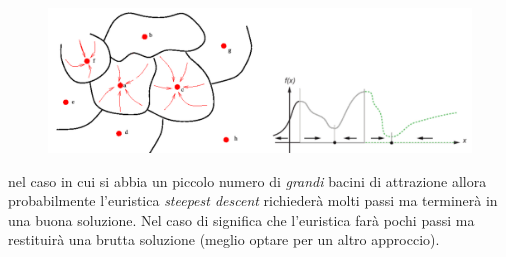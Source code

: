 \documentclass{article}
\begin{document}
\begin{figure}[h]
    \centering
    \includegraphics[scale=0.3]{images/attr_basins.png}
\end{figure}

nel caso in cui si abbia un piccolo numero di \textit{grandi} bacini di attrazione allora probabilmente
l'euristica \textit{steepest descent} richiederà molti passi ma terminerà in una buona soluzione. Nel
caso di significa che l'euristica farà pochi passi ma restituirà una brutta soluzione (meglio optare
per un altro approccio).
\end{document}
